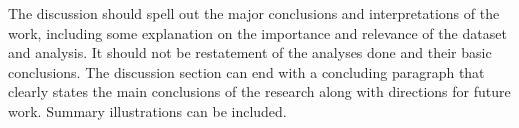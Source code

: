 \documentclass[a4paper,num-refs]{oup-contemporary}
\begin{document}
The discussion should spell out the major conclusions and interpretations of the work, including some explanation on the importance and relevance of the dataset and analysis. It should not be restatement of the analyses done and their basic conclusions. The discussion section can end with a concluding paragraph that clearly states the main conclusions of the research along with directions for future work. Summary illustrations can be included.

\end{document}
